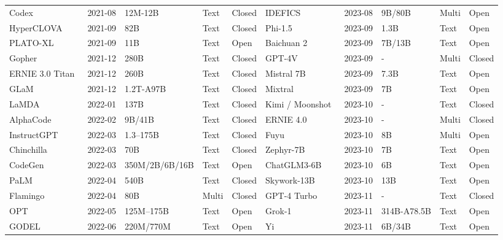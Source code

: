 \begin{table}[htbp]
{\begin{tabular}{@{} lllll | lllll @{}}
Codex~\cite{chen2021evaluating} & 2021-08 & 12M-12B & Text & Closed & IDEFICS~\cite{laurenccon2023obelics} & 2023-08 & 9B/80B & Multi & Open \\
HyperCLOVA~\cite{kim2021hyperclova} & 2021-09 & 82B & Text & Closed & Phi-1.5~\cite{li2023phi15} & 2023-09 & 1.3B & Text & Open \\
PLATO-XL~\cite{bao2022plato} & 2021-09 & 11B & Text & Open & Baichuan 2~\cite{baichuan2023baichuan2} & 2023-09 & 7B/13B & Text & Open \\
Gopher~\cite{rae2021scaling} & 2021-12 & 280B & Text & Closed & GPT-4V~\cite{openai2023gpt4v} & 2023-09 & - & Multi & Closed \\
ERNIE 3.0 Titan~\cite{wang2021ernie} & 2021-12 & 260B & Text & Closed & Mistral 7B~\cite{jiang2023mistral7b} & 2023-09 & 7.3B & Text & Open \\
GLaM~\cite{du2022glam} & 2021-12 & 1.2T-A97B & Text & Closed & Mixtral~\cite{jiang2024mixtral} & 2023-09 & 7B & Text & Open \\
LaMDA~\cite{thoppilan2022lamda} & 2022-01 & 137B & Text & Closed & Kimi / Moonshot~\cite{moonshot2024kimi} & 2023-10 & - & Text & Closed \\
AlphaCode~\cite{li2022competition} & 2022-02 & 9B/41B & Text & Closed & ERNIE 4.0~\cite{baidu2023ernie4} & 2023-10 & - & Multi & Closed \\
InstructGPT~\cite{ouyang2022training} & 2022-03 & 1.3--175B & Text & Closed & Fuyu~\cite{adept2023fuyu} & 2023-10 & 8B & Multi & Open \\
Chinchilla~\cite{hoffmann2022chinchilla} & 2022-03 & 70B & Text & Closed & Zephyr-7B~\cite{tunstall2023zephyr} & 2023-10 & 7B & Text & Open \\
CodeGen~\cite{nijkamp2022conversational} & 2022-03 & 350M/2B/6B/16B & Text & Open & ChatGLM3-6B~\cite{thudm2023chatglm3-6b} & 2023-10 & 6B & Text & Open \\
PaLM~\cite{chowdhery2022palm} & 2022-04 & 540B & Text & Closed & Skywork-13B~\cite{wei2023skywork} & 2023-10 & 13B & Text & Open \\
Flamingo~\cite{alayrac2022flamingo} & 2022-04 & 80B & Multi & Closed & GPT-4 Turbo~\cite{openai2023devday,openai2024gpt4turbo} & 2023-11 & - & Text & Closed \\
OPT~\cite{zhang2022opt} & 2022-05 & 125M--175B & Text & Open & Grok-1~\cite{xai2024grok} & 2023-11 & 314B-A78.5B & Text & Open \\
GODEL~\cite{peng2022godel} & 2022-06 & 220M/770M & Text & Open & Yi~\cite{young2024yi} & 2023-11 & 6B/34B & Text & Open \\

\end{tabular}}
\end{table}
